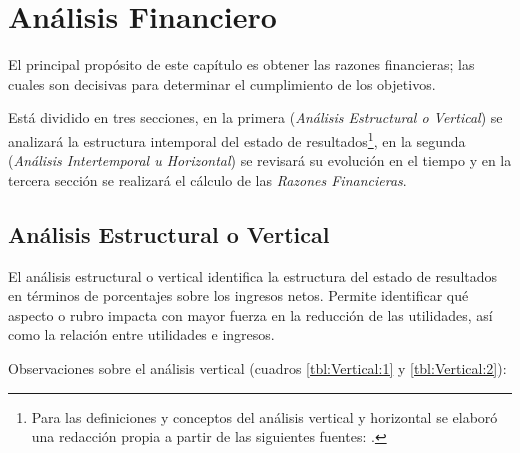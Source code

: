 \chapter{Análisis Financiero}
\label{cap:AnalsisFinanciero}


El principal propósito de este capítulo es obtener las razones financieras; las cuales son decisivas para determinar el cumplimiento de los objetivos.

Está dividido en tres secciones, en la primera (\emph{Análisis Estructural o Vertical}) se analizará la estructura intemporal del estado de resultados\footnote{Para las definiciones y conceptos del análisis vertical y horizontal se elaboró una redacción propia a partir de las siguientes fuentes: \citep{brock1987contabilidad, mejia2006diccionario, dobarganes2005contabilidad}.}, en la segunda (\emph{Análisis Intertemporal u Horizontal}) se revisará su evolución en el tiempo y en la tercera sección se realizará el cálculo de las \emph{Razones Financieras}.

\section{Análisis Estructural o Vertical}
\label{sec:AnalisisVertical}

El análisis estructural o vertical identifica la estructura del estado de resultados en términos de porcentajes sobre los ingresos netos. Permite identificar qué aspecto o rubro impacta con mayor fuerza en la reducción de las utilidades, así como la relación entre utilidades e ingresos.

Observaciones sobre el análisis vertical (cuadros \ref{tbl:Vertical:1} y \ref{tbl:Vertical:2}):

